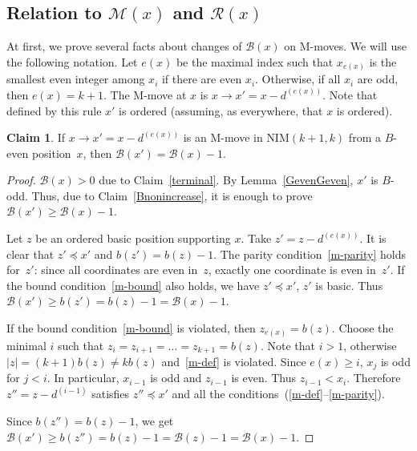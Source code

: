 \documentclass{article}
\theoremstyle{definition}
\newtheorem{claim}{Claim}
\def\mv#1{d^{(#1)}}
\def\B{\mathcal{B}}
\def\R{\mathcal{R}}
\def\M{\mathcal{M}}
\begin{document}
\subsection{Relation to \boldmath $\M(x) $ and $\R(x)$}

At first, we prove several facts about changes of $\B(x)$ on M-moves. We will use the following notation.
Let $e(x)$ be the maximal index such that $x_{e(x)}$ is the smallest even integer among $x_i$ if there are even $x_i$. Otherwise, if all $x_i$ are odd, then $e(x)=k+1$. The M-move at $x$ is $x\to x' = x-\mv{e(x)}$. Note that  defined by this rule $x'$ is ordered (assuming, as everywhere, that $x$ is ordered).



\begin{claim}\label{FromGeven}
   If $x\to x'= x-\mv{e(x)}$ is an M-move in \textup{NIM}$(k+1,k)$ from a $B$-even position~$x$, then  $\B(x') = \B(x)-1$.
\end{claim}
\begin{proof}
 $\B(x)>0$ due to Claim~\ref{terminal}. By Lemma~\ref{GevenGeven}, $x'$ is $B$-odd. Thus, due to Claim~\ref{Bnonincrease}, it is enough to prove  $\B(x')\geq \B(x)-1$. 

  Let $z$ be an ordered basic position supporting $x$. Take $z'=z-\mv{e(x)}$. It is clear that $z'\preceq x'$ and $b(z')= b(z)-1$. The parity condition~\eqref{m-parity} holds for~$z'$: since  all coordinates are even in~$z$, exactly one coordinate is even in~$z'$.
If the bound condition~\eqref{m-bound} also  holds, we have $z'\preceq x'$, $z'$ is basic. Thus $\B(x')\geq b(z') =b(z)-1 =  \B(x)-1$.
  
If the bound condition~\eqref{m-bound} is violated, then $z_{e(x)} =b(z)$. Choose the minimal $i$ such that $z_i=z_{i+1}=\dots=z_{k+1}=b(z)$. Note that $i>1$, otherwise $|z|=(k+1)b(z)\ne kb(z)$ and~\eqref{m-def} is violated. Since $e(x)\geq i$, $x_j$ is odd for $j<i$. In particular,  $x_{i-1}$ is odd and $z_{i-1}$ is even. Thus $z_{i-1}< x_i$. Therefore  $z'' = z- \mv{i-1} $ satisfies $z''\preceq x'$ and all the conditions~(\ref{m-def}--\ref{m-parity}). 

  Since $b(z'') = b(z)-1$, we get  $\B(x')\geq b(z'') =b(z)-1= \B(z)-1 = \B(x)-1$.
\end{proof}
\end{document}
